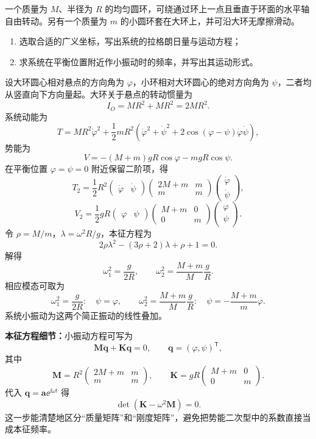 \begin{question}[匀质环与小圆环]
一个质量为 $M$、半径为 $R$ 的均匀圆环，可绕通过环上一点且垂直于环面的水平轴自由转动。另有一个质量为 $m$ 的小圆环套在大环上，并可沿大环无摩擦滑动。
\begin{enumerate}
  \item 选取合适的广义坐标，写出系统的拉格朗日量与运动方程；
  \item 求系统在平衡位置附近作小振动时的频率，并写出其运动形式。
\end{enumerate}

\begin{solution}
设大环圆心相对悬点的方向角为 $\varphi$，小环相对大环圆心的绝对方向角为 $\psi$，二者均从竖直向下方向量起。大环关于悬点的转动惯量为
\[
  I_O=MR^2+MR^2=2MR^2.
\]
系统动能为
\[
  T=MR^2\dot\varphi^2+\frac12mR^2
  \left(\dot\varphi^2+\dot\psi^2+2\cos(\varphi-\psi)\dot\varphi\dot\psi\right),
\]
势能为
\[
  V=-(M+m)gR\cos\varphi-mgR\cos\psi.
\]
在平衡位置 $\varphi=\psi=0$ 附近保留二阶项，得
\[
  T_2=\frac12R^2
  \begin{pmatrix}\dot\varphi&\dot\psi\end{pmatrix}
  \begin{pmatrix}2M+m&m\\m&m\end{pmatrix}
  \begin{pmatrix}\dot\varphi\\\dot\psi\end{pmatrix},
\]
\[
  V_2=\frac12gR
  \begin{pmatrix}\varphi&\psi\end{pmatrix}
  \begin{pmatrix}M+m&0\\0&m\end{pmatrix}
  \begin{pmatrix}\varphi\\\psi\end{pmatrix}.
\]
令 $\rho=M/m$，$\lambda=\omega^2R/g$，本征方程为
\[
  2\rho\lambda^2-(3\rho+2)\lambda+\rho+1=0.
\]
解得
\[
  \boxed{\omega_1^2=\frac{g}{2R}},
  \qquad
  \boxed{\omega_2^2=\frac{M+m}{M}\frac{g}{R}}.
\]
相应模态可取为
\[
  \omega_1^2=\frac{g}{2R}:\quad \psi=\varphi,
  \qquad
  \omega_2^2=\frac{M+m}{M}\frac{g}{R}:\quad \psi=-\frac{M+m}{m}\varphi.
\]
系统小振动为这两个简正振动的线性叠加。


\medskip
\textbf{本征方程细节：}小振动方程可写为
\[
  \mathbf M\ddot{\boldsymbol q}+\mathbf K\boldsymbol q=0,
  \qquad
  \boldsymbol q=(\varphi,\psi)^{\mathsf T},
\]
其中
\[
  \mathbf M=R^2\begin{pmatrix}2M+m&m\\m&m\end{pmatrix},
  \qquad
  \mathbf K=gR\begin{pmatrix}M+m&0\\0&m\end{pmatrix}.
\]
代入 $\boldsymbol q=\boldsymbol a\ee^{\ii\omega t}$ 得
\[
  \det(\mathbf K-\omega^2\mathbf M)=0.
\]
这一步能清楚地区分“质量矩阵”和“刚度矩阵”，避免把势能二次型中的系数直接当成本征频率。
\end{solution}
\end{question}
